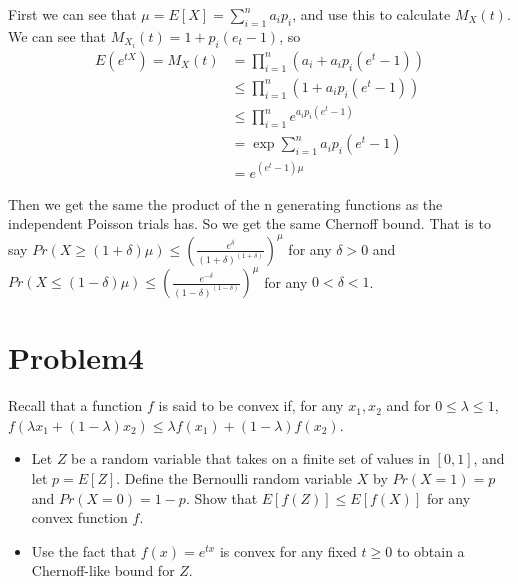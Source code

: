 \documentclass[12pt]{article}
\begin{document}
First we can see that $\mu=E[X]=\sum_{i=1}^{n} a_ip_i$, and use this to calculate $M_X(t)$. We can see that $M_{X_i}(t) = 1+p_i(e_t-1)$, so
\begin{equation}
    \begin{split}
    E(e^{tX}) = M_X(t) &= \prod_{i=1}^{n} (a_i + a_i p_i (e^t-1)) \\
    &\le \prod_{i=1}^{n} (1 + a_i p_i (e^t-1)) \\
    &\le \prod_{i=1}^{n} e^{a_i p_i (e^t-1)} \\
    &= \exp{\sum_{i=1}^{n} a_i p_i (e^t-1)} \\
    &= e^{(e^t-1)\mu}
    \end{split}
\end{equation}

Then we get the same the product of the n generating functions as the independent Poisson trials has. So we get the same Chernoff bound.
That is to say
$Pr(X \ge (1+\delta) \mu) \le (\frac{e^\delta}{(1+\delta)^{(1+\delta)}})^\mu$ for any $\delta>0$ and  $Pr(X \le (1-\delta)\mu)\le (\frac{e^{-\delta}}{(1-\delta)^{(1-\delta)}})^\mu$ for any $0 < \delta < 1$.


\section{Problem4}
Recall that a function $f$ is said to be convex if, for any $x_1, x_2$ and for $0 \le \lambda \le 1$, $f(\lambda x_1 + (1-\lambda) x_2) \le \lambda f(x_1)+ (1-\lambda) f(x_2)$.
\begin{itemize}
    \item Let $Z$ be a random variable that takes on a finite set of values in $[0, 1]$, and let $p = E[Z]$. Define the Bernoulli random variable $X$ by $Pr(X = 1) = p$ and $Pr(X = 0) = 1-p$. Show that $E[f(Z)] \le E[f(X)]$ for any convex function $f$.
    \item Use the fact that $f(x) = e^{tx}$ is convex for any fixed $t \ge 0$ to obtain a Chernoff-like bound for $Z$.\\
\end{itemize}
\end{document}
